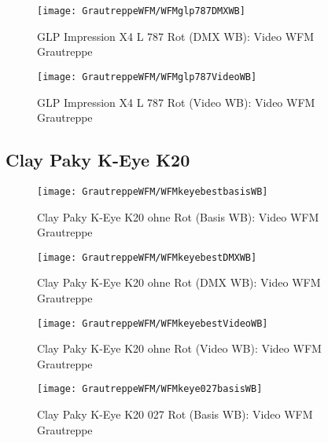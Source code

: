 \documentclass[pagesize,paper=A4,fontsize=12pt,utf8,numbers=noenddot,bibliography=totoc,listof=totoc,DIV=11,BCOR=1mm]{scrreprt}
\begin{document}
\begin{figure}[htp]     %
\centering
\texttt{[image: GrautreppeWFM/WFMglp787DMXWB]} 
\caption {GLP Impression X4 L 787 Rot (DMX WB): Video WFM Grautreppe} 
\end{figure}

\begin{figure}[htp]     %
\centering
\texttt{[image: GrautreppeWFM/WFMglp787VideoWB]} 
\caption {GLP Impression X4 L 787 Rot (Video WB): Video WFM Grautreppe} 
\end{figure}



\subsection{Clay Paky K-Eye K20}

\begin{figure}[htp]     %
\centering
\texttt{[image: GrautreppeWFM/WFMkeyebestbasisWB]} 
\caption {Clay Paky K-Eye K20 ohne Rot (Basis WB): Video WFM Grautreppe} 
\end{figure}

\begin{figure}[htp]     %
\centering
\texttt{[image: GrautreppeWFM/WFMkeyebestDMXWB]} 
\caption {Clay Paky K-Eye K20 ohne Rot (DMX WB): Video WFM Grautreppe} 
\end{figure}

\begin{figure}[htp]     %
\centering
\texttt{[image: GrautreppeWFM/WFMkeyebestVideoWB]} 
\caption {Clay Paky K-Eye K20 ohne Rot (Video WB): Video WFM Grautreppe} 
\end{figure}



\begin{figure}[htp]     %
\centering
\texttt{[image: GrautreppeWFM/WFMkeye027basisWB]} 
\caption {Clay Paky K-Eye K20 027 Rot (Basis WB): Video WFM Grautreppe} 
\end{figure}
\end{document}
